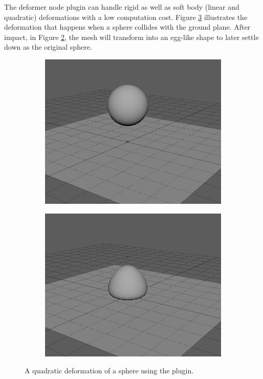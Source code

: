 The deformer node plugin can handle rigid as well as soft body (linear and quadratic) deformations with a low computation cost. 
Figure \ref{fig:maya} illustrates the deformation that happens when a sphere collides with the ground plane. 
After impact, in Figure \ref{fig:sfig2}, the mesh will transform into an egg-like shape to later settle down as the original sphere.

\begin{figure} [h!]
\begin{subfigure}{.5\linewidth}
  \centering
  \includegraphics[width=0.98\linewidth]{img/def1.png}
  \caption{}
  \label{fig:sfig1}
\end{subfigure}%
\begin{subfigure}{.5\linewidth}
  \centering
  \includegraphics[width=0.98\linewidth]{img/def2.png}
  \caption{}
  \label{fig:sfig2}
\end{subfigure}
\caption{A quadratic deformation of a sphere using the plugin.}
\label{fig:maya}
\end{figure}

